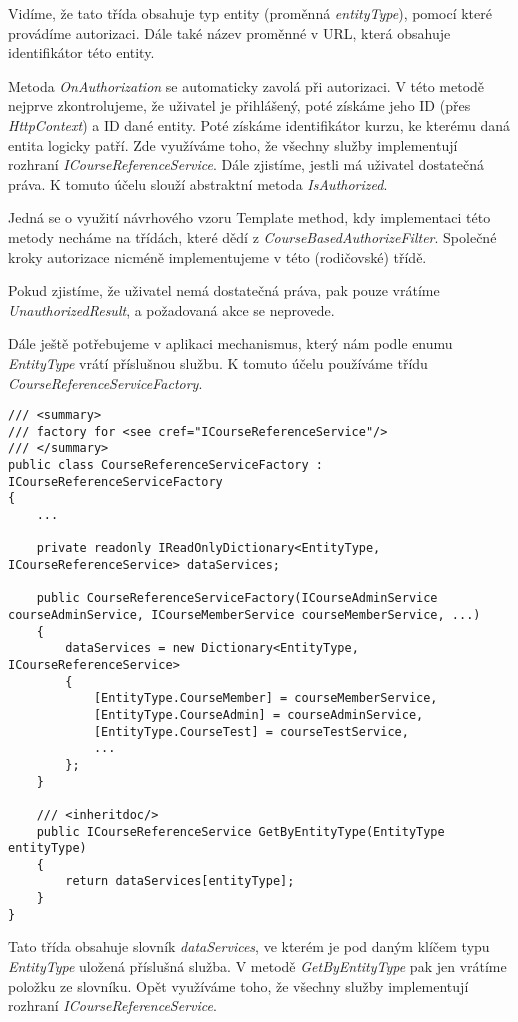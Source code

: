 Vidíme, že tato třída obsahuje typ entity (proměnná \textit{entityType}), pomocí které provádíme autorizaci. Dále také název proměnné v URL, která obsahuje identifikátor této entity. 

Metoda \textit{OnAuthorization} se automaticky zavolá při autorizaci. V této metodě nejprve zkontrolujeme, že uživatel je přihlášený, poté získáme jeho ID (přes \textit{HttpContext}) a ID dané entity. Poté získáme identifikátor kurzu, ke kterému daná entita logicky patří. Zde využíváme toho, že všechny služby implementují rozhraní \textit{ICourseReferenceService}. 
Dále zjistíme, jestli má uživatel dostatečná práva. K tomuto účelu slouží abstraktní metoda \textit{IsAuthorized}. 

Jedná se o využití návrhového vzoru Template method, kdy implementaci této metody necháme na třídách, které dědí z \textit{CourseBasedAuthorizeFilter}. 
Společné kroky autorizace nicméně implementujeme v této (rodičovské) třídě.

Pokud zjistíme, že uživatel nemá dostatečná práva, pak pouze vrátíme \textit{UnauthorizedResult}, a požadovaná akce se neprovede.

Dále ještě potřebujeme v aplikaci mechanismus, který nám podle enumu \textit{EntityType} vrátí příslušnou službu. K tomuto účelu používáme třídu \textit{CourseReferenceServiceFactory}.
\begin{lstlisting}
/// <summary>
/// factory for <see cref="ICourseReferenceService"/>
/// </summary>
public class CourseReferenceServiceFactory : ICourseReferenceServiceFactory
{
	...
	
	private readonly IReadOnlyDictionary<EntityType, ICourseReferenceService> dataServices;
	
	public CourseReferenceServiceFactory(ICourseAdminService courseAdminService, ICourseMemberService courseMemberService, ...)
	{
		dataServices = new Dictionary<EntityType, ICourseReferenceService>
		{
			[EntityType.CourseMember] = courseMemberService,
			[EntityType.CourseAdmin] = courseAdminService,
			[EntityType.CourseTest] = courseTestService,
			...
		};
	}
	
	/// <inheritdoc/>
	public ICourseReferenceService GetByEntityType(EntityType entityType)
	{
		return dataServices[entityType];
	}
}
\end{lstlisting}

Tato třída obsahuje slovník \textit{dataServices}, ve kterém je pod daným klíčem typu \textit{EntityType} uložená příslušná služba.
V metodě \textit{GetByEntityType} pak jen vrátíme položku ze slovníku.
Opět využíváme toho, že všechny služby implementují rozhraní \textit{ICourseReferenceService}.

